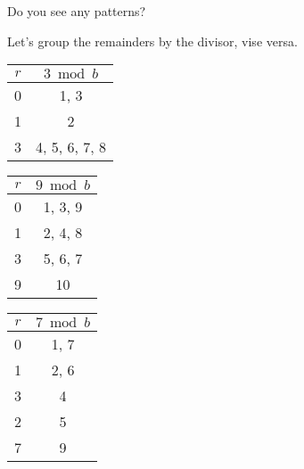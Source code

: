 \vfill
Do you see any patterns?
\newpage

Let's group the remainders by the divisor, vise versa.\\


\noindent
\begin{minipage}{0.32\textwidth}
    \centering
    \begin{tabular}{c|c}
        $r$ & $3 \bmod b$   \\
        \hline
        0   & 1, 3          \\
        1   & 2             \\
        3   & 4, 5, 6, 7, 8 \\
    \end{tabular}
\end{minipage}%
\begin{minipage}{0.32\textwidth}
    \centering
    \begin{tabular}{c|c}
        $r$ & $9 \bmod b$ \\
        \hline
        0   & 1, 3, 9     \\
        1   & 2, 4, 8     \\
        3   & 5, 6, 7     \\
        9   & 10          \\
    \end{tabular}
\end{minipage}%
\begin{minipage}{0.32\textwidth}
    \centering
    \begin{tabular}{c|c}
        $r$ & $7 \bmod b$ \\
        \hline
        0   & 1, 7        \\
        1   & 2, 6        \\
        3   & 4           \\
        2   & 5           \\
        7   & 9           \\
    \end{tabular}
\end{minipage}
